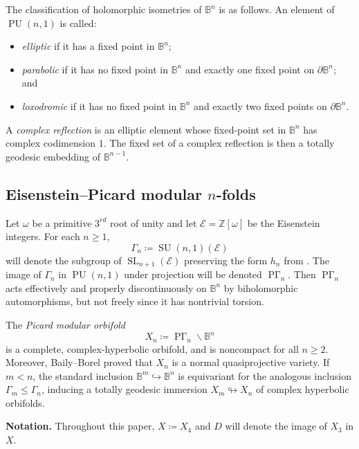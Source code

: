 \documentclass[11pt]{amsart}
\theoremstyle{plain}
\theoremstyle{definition}
\theoremstyle{remark}
\newcommand{\bbB}{\mathbb{B}}
\newcommand{\bbZ}{\mathbb{Z}}
\newcommand{\calE}{\mathcal{E}}
\newcommand{\Gam}{\Gamma}
\DeclareMathOperator{\SL}{SL}
\DeclareMathOperator{\PU}{PU}
\DeclareMathOperator{\SU}{SU}
\newcommand{\bs}{\backslash}
\DeclareMathOperator{\PGam}{\mathrm{P}\Gamma}
\begin{document}
The classification of holomorphic isometries of $\bbB^n$ is as follows. An element of $\PU(n,1)$ is called:
\begin{itemize}

  \item \emph{elliptic} if it has a fixed point in $\bbB^n$;

  \item \emph{parabolic} if it has no fixed point in $\bbB^n$ and exactly one fixed point on $\partial\bbB^n$; and

  \item \emph{loxodromic} if it has no fixed point in $\bbB^n$ and exactly two fixed points on $\partial\bbB^n$.

\end{itemize}
A \emph{complex reflection} is an elliptic element whose fixed-point set in $\bbB^n$ has complex codimension $1$. The fixed set of a complex reflection is then a totally geodesic embedding of $\bbB^{n-1}$.

\subsection{Eisenstein--Picard modular $n$-folds}\label{hypprel}

 Let $\omega$ be a primitive $3^{rd}$ root of unity and let $\calE = \bbZ[\omega]$ be the Eisenstein integers. For each $n \ge 1$,
	\[
	\Gam_n \coloneqq \SU(n,1)(\calE)
	\]
will denote the subgroup of $\SL_{n+1}(\calE)$ preserving the form $h_n$ from . The image of $\Gam_n$ in $\PU(n,1)$ under projection will be denoted $\PGam_n$. Then $\PGam_n$ acts effectively and properly discontinuously on $\bbB^n$ by biholomorphic automorphisms, but not freely since it has nontrivial torsion.

The \emph{Picard modular orbifold} 
	\[
		X_n \coloneqq \PGam_n \bs \bbB^n
	\]
is a complete, complex-hyperbolic orbifold, and is noncompact for all $n \ge 2$. Moreover, Baily--Borel \cite{BailyBorel} proved that $X_n$ is a normal quasiprojective variety. If $m < n$, the standard inclusion $\bbB^m \hookrightarrow \bbB^n$ is equivariant for the analogous inclusion $\Gam_m \le \Gam_n$, inducing a totally geodesic immersion $X_m \looparrowright X_n$ of complex hyperbolic orbifolds.

\medskip

\noindent\textbf{Notation.} Throughout this paper, $X \coloneqq X_4$ and $D$ will denote the image of $X_3$ in $X$.
\end{document}
